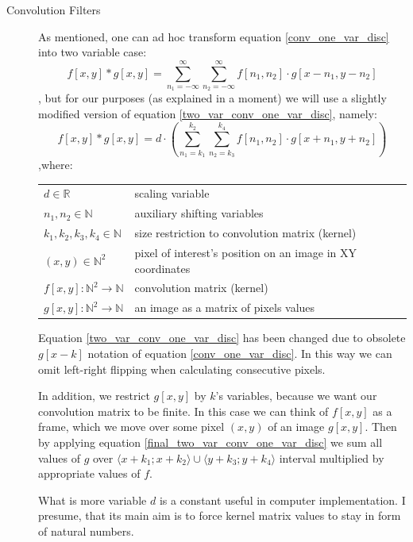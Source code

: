 \documentclass{article}
\makeatletter
\newenvironment{conditions}
  {\par\vspace{\abovedisplayskip}\noindent\begin{tabular}{>{$}l<{$} @{${}\equiv{}$} l}}
  {\end{tabular}\par\vspace{\belowdisplayskip}}
\makeatother
\begin{document}
\begin{description}
%
%
\item[Convolution Filters]
As mentioned, one can ad hoc transform equation \ref{conv_one_var_disc} into two variable case:
\begin{equation} \label{two_var_conv_one_var_disc}
f[x,y] * g[x,y] =\sum_{n_{1}=-\infty}^{\infty} \sum_{n_{2}=-\infty}^{\infty} f[n_{1}, n_{2}] \cdot g[x-n_{1}, y - n_{2}]
\end{equation}
, but for our purposes (as explained in a moment) we will use a slightly modified version of equation \ref{two_var_conv_one_var_disc}, namely:
\begin{equation} \label{final_two_var_conv_one_var_disc}
f[x,y] * g[x,y] = d \cdot (\sum_{n_{1}=k_{1}}^{k_{2}} \sum_{n_{2}=k_{3}}^{k_{4}} f[n_{1}, n_{2}] \cdot g[x+n_{1}, y + n_{2}])
\end{equation}
,where:
\begin{conditions} 
  d \in \mathbb{R} & scaling variable\\
  n_{1}, n_{2} \in \mathbb{N}& auxiliary shifting variables\\
  k_{1}, k_{2}, k_{3}, k_{4} \in \mathbb{N}& size restriction to convolution matrix (kernel)\\
 (x,y) \in \mathbb{N}^{2}     &  pixel of interest's position on an image in XY coordinates \\   
 f[x,y] : \mathbb{N}^{2} \rightarrow \mathbb{N} &  convolution matrix (kernel) \\
 g[x,y] : \mathbb{N}^{2} \rightarrow \mathbb{N} & an image as a matrix of pixels values
\end{conditions}

Equation \ref{two_var_conv_one_var_disc} has been changed due to obsolete $g[x-k]$ notation of equation \ref{conv_one_var_disc}. In this way we can omit left-right flipping when calculating consecutive pixels.

In addition, we restrict $g[x,y]$ by $k$'s variables, because we want our convolution matrix to be finite. 
In this case we can think of $f[x,y]$ as a frame, which we move over some pixel $(x,y)$ of an image $g[x,y]$. Then by applying equation \ref{final_two_var_conv_one_var_disc} we sum all values of $g$ over
$ \langle x + k_1; x+ k_2 \rangle \cup \langle y + k_3 ; y + k_4 \rangle$ interval multiplied by appropriate values of $f$.

What is more variable $d$ is a constant useful in computer implementation. I presume, that its main aim is to force kernel matrix values to stay in form of natural numbers.


\end{description}
\end{document}
